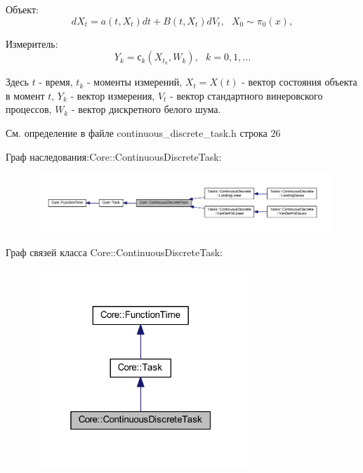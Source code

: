 \begin{DoxyItemize}
\item Объект\+: \[dX_t = a(t, X_t)dt + B(t, X_t)dV_t,\ \ \ X_0 \sim \pi_0(x),\]
\item Измеритель\+: \[Y_k = с_k(X_{t_k}, W_k),\ \ \ k = 0, 1, \ldots\]
\end{DoxyItemize}

Здесь $t$ -\/ время, $t_k$ -\/ моменты измерений, $X_t = X(t)$ -\/ вектор состояния объекта в момент $t$, $Y_k$ -\/ вектор измерения, $V_t$ -\/ вектор стандартного винеровского процессов, $W_k$ -\/ вектор дискретного белого шума. 

См. определение в файле continuous\+\_\+discrete\+\_\+task.\+h строка 26



Граф наследования\+:Core\+:\+:Continuous\+Discrete\+Task\+:\nopagebreak
\begin{figure}[H]
\begin{center}
\leavevmode
\includegraphics[width=350pt]{class_core_1_1_continuous_discrete_task__inherit__graph}
\end{center}
\end{figure}


Граф связей класса Core\+:\+:Continuous\+Discrete\+Task\+:\nopagebreak
\begin{figure}[H]
\begin{center}
\leavevmode
\includegraphics[width=229pt]{class_core_1_1_continuous_discrete_task__coll__graph}
\end{center}
\end{figure}


